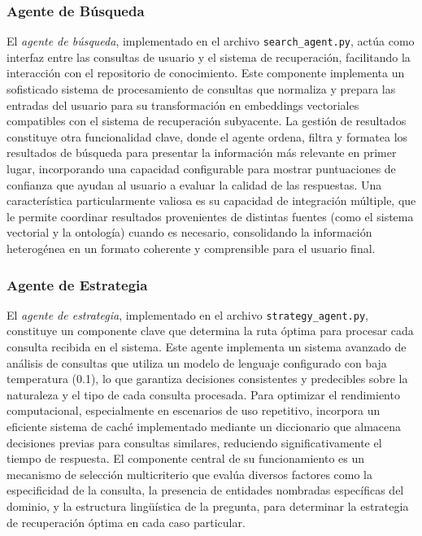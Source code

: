 \documentclass[runningheads]{llncs}
\begin{document}
\subsubsection{Agente de Búsqueda}
El \textit{agente de búsqueda}, implementado en el archivo \texttt{search\_agent.py}, actúa como interfaz entre las consultas de usuario y el sistema de recuperación, facilitando la interacción con el repositorio de conocimiento. Este componente implementa un sofisticado sistema de procesamiento de consultas que normaliza y prepara las entradas del usuario para su transformación en embeddings vectoriales compatibles con el sistema de recuperación subyacente. La gestión de resultados constituye otra funcionalidad clave, donde el agente ordena, filtra y formatea los resultados de búsqueda para presentar la información más relevante en primer lugar, incorporando una capacidad configurable para mostrar puntuaciones de confianza que ayudan al usuario a evaluar la calidad de las respuestas. Una característica particularmente valiosa es su capacidad de integración múltiple, que le permite coordinar resultados provenientes de distintas fuentes (como el sistema vectorial y la ontología) cuando es necesario, consolidando la información heterogénea en un formato coherente y comprensible para el usuario final.

\subsubsection{Agente de Estrategia}
El \textit{agente de estrategia}, implementado en el archivo \texttt{strategy\_agent.py}, constituye un componente clave que determina la ruta óptima para procesar cada consulta recibida en el sistema. Este agente implementa un sistema avanzado de análisis de consultas que utiliza un modelo de lenguaje configurado con baja temperatura (0.1), lo que garantiza decisiones consistentes y predecibles sobre la naturaleza y el tipo de cada consulta procesada. Para optimizar el rendimiento computacional, especialmente en escenarios de uso repetitivo, incorpora un eficiente sistema de caché implementado mediante un diccionario que almacena decisiones previas para consultas similares, reduciendo significativamente el tiempo de respuesta. El componente central de su funcionamiento es un mecanismo de selección multicriterio que evalúa diversos factores como la especificidad de la consulta, la presencia de entidades nombradas específicas del dominio, y la estructura lingüística de la pregunta, para determinar la estrategia de recuperación óptima en cada caso particular.
\end{document}
